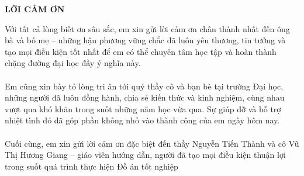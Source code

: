 \documentclass[../DoAn.tex]{subfiles}
\begin{document}
\begin{center}
    \Large{\textbf{LỜI CẢM ƠN}}\\
\end{center}
\vspace{1cm}
Với tất cả lòng biết ơn sâu sắc, em xin gửi lời cảm ơn chân thành nhất đến ông bà và bố mẹ – những hậu phương vững chắc đã luôn yêu thương, tin tưởng và tạo mọi điều kiện tốt nhất để em có thể chuyên tâm học tập và hoàn thành chặng đường đại học đầy ý nghĩa này.\\\\
Em cũng xin bày tỏ lòng tri ân tới quý thầy cô và bạn bè tại trường Đại học,
những người đã luôn đồng hành, chia sẻ kiến thức và kinh nghiệm, cùng nhau vượt
qua khó khăn trong suốt những năm học vừa qua. Sự giúp đỡ và hỗ trợ nhiệt tình
đó đã góp phần không nhỏ vào thành công của em ngày hôm nay.\\\\
Cuối cùng, em xin gửi lời cảm ơn đặc biệt đến thầy Nguyễn Tiến Thành và cô Vũ Thị Hương Giang – giáo
viên hướng dẫn, người đã tạo mọi điều kiện thuận lợi trong suốt quá trình thực hiện
Đồ án tốt nghiệp
\end{document}

